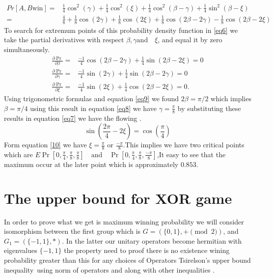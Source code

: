 \begin{align}
Pr[A,B \text{win}]=& \frac{1}{4} \cos^2(\gamma)+\frac{1}{4} \cos^2(\xi)+\frac{1}{4} \cos^2(\beta-\gamma)+\frac{1}{4} \sin^2(\beta-\xi)\label{finpr}\\ 
=&\frac{4}{8} +\frac{1}{8}  \cos(2 \gamma)+\frac{1}{8}  \cos(2 \xi)+\frac{1}{8}  \cos(2\beta-2\gamma)-\frac{1}{8} \cos(2\beta-2\xi)\label{eq6}
\end{align}
To search for extremum points of this probability density function in \ref{eq6} we take the partial derivatives with respect $\beta ,\gamma  \text{and} \quad \xi$,  and equal it by zero simultaneously.
\begin{align}
\frac{\partial \Pr}{\partial \beta}=& \frac{-1}{4}\cos(2\beta-2\gamma)+ \frac{1}{4}\sin(2\beta-2\xi)=0\label{eq7} \\
\frac{\partial\Pr}{\partial \gamma}=& \frac{-1}{4}\sin(2\gamma)+ \frac{1}{4}\sin(2\beta-2\gamma)=0\label{eq8}\\
\frac{\partial \Pr}{\partial \xi}=& \frac{-1}{4}\sin(2\xi)+ \frac{1}{4}\cos(2\beta-2\xi)=0\label{eq9}.
\end{align}
Using trigonometric formulas and  equation  \ref{eq9} we found $2\beta=\pi/2$ which implies $\beta=\pi/4$
using this result in equation \ref{eq8} we have $ \gamma=\frac{\pi}{8}$ by substituting these results in equation \ref{eq7} we have the flowing .
\begin{equation}
\sin(\frac{2\pi}{4}-2\xi)=\cos(\frac{\pi}{4})\label{10}
\end{equation}
Form   equation  \ref{10} we have $\xi=\frac{\pi}{8}$ or $\frac{-\pi}{8}$.This implies we have two critical points which are $E\Pr[0,\frac{\pi}{4},\frac{\pi}{8} ,\frac{\pi}{8}] \quad \text{and}\quad \Pr[0,\frac{\pi}{4},\frac{\pi}{8} ,\frac{-\pi}{8}]$,It easy to see that the maximum occur at the  later  point which is  approximately $0.853$.


\section{The upper bound for XOR game}
In order to prove what we get is maximum winning  probability we will consider isomorphism between  the first group   which is $G=(\{0,1\},+ \pmod{2})$, and  $ G_1=(\{-1,1\},*)$. In the latter our unitary operators  become hermitian with eigenvalues $\{-1,1\}$ the property need to proof there is  no existence wining probability greater than this for any choices of Operators Tsirelson’s  upper bound inequality~\citep{Cirel'son1980}using  norm of operators  and along with other inequalities .%

